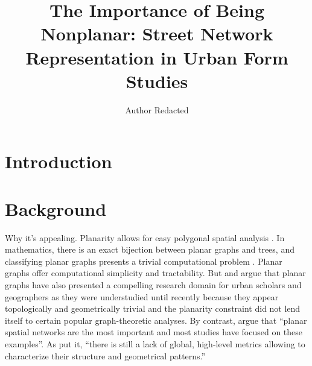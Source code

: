 \documentclass[Afour,sageh,times]{sagej}
\begin{document}
\title{The Importance of Being Nonplanar: Street Network Representation in Urban Form Studies}
\author{Author Redacted }


\begin{abstract}

\end{abstract}


\maketitle

\section{Introduction}




\section{Background}

Why it's appealing. Planarity allows for easy polygonal spatial analysis \citep{fohl_non-planar_1996}. In mathematics, there is an exact bijection between planar graphs and trees, and classifying planar graphs presents a trivial computational problem \citep{louf_typology_2014}. Planar graphs offer computational simplicity and tractability. But \citet{masucci_random_2009} and \citet{masucci_limited_2013} argue that planar graphs have also presented a compelling research domain for urban scholars and geographers as they were understudied until recently because they appear topologically and geometrically trivial and the planarity constraint did not lend itself to certain popular graph-theoretic analyses. By contrast, \citet[p.~3]{barthelemy_spatial_2011} argue that \enquote{planar spatial networks are the most important and most studies have focused on these examples}. As \citet[p.~1]{viana_simplicity_2013} put it, \enquote{there is still a lack of global, high-level metrics allowing to characterize their structure and geometrical patterns.}
\end{document}

